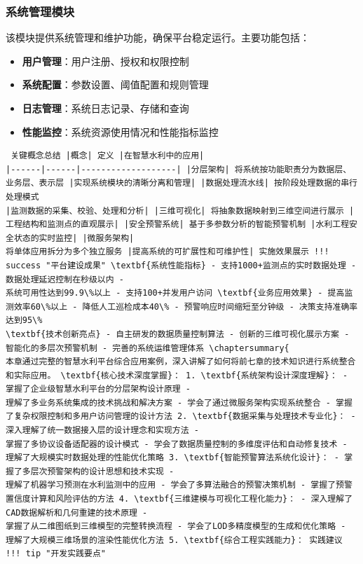 \subsubsection{系统管理模块}\label{ux7cfbux7edfux7ba1ux7406ux6a21ux5757} 该模块提供系统管理和维护功能，确保平台稳定运行。主要功能包括： \begin{itemize}
\tightlist \item \textbf{用户管理}：用户注册、授权和权限控制 \item \textbf{系统配置}：参数设置、阈值配置和规则管理 \item \textbf{日志管理}：系统日志记录、存储和查询 \item
\textbf{性能监控}：系统资源使用情况和性能指标监控 \end{itemize} \begin{verbatim} 关键概念总结 |概念| 定义 |在智慧水利中的应用|
|------|------|-------------------| |分层架构| 将系统按功能职责分为数据层、业务层、表示层 |实现系统模块的清晰分离和管理| |数据处理流水线| 按阶段处理数据的串行处理模式
|监测数据的采集、校验、处理和分析| |三维可视化| 将抽象数据映射到三维空间进行展示 |工程结构和监测点的直观展示| |安全预警系统| 基于多参数分析的智能预警机制 |水利工程安全状态的实时监控| |微服务架构|
将单体应用拆分为多个独立服务 |提高系统的可扩展性和可维护性| 实施效果展示 !!! success "平台建设成果" \textbf{系统性能指标} - 支持1000+监测点的实时数据处理 - 数据处理延迟控制在秒级以内 -
系统可用性达到99.9\%以上 - 支持100+并发用户访问 \textbf{业务应用效果} - 提高监测效率60\%以上 - 降低人工巡检成本40\% - 预警响应时间缩短至分钟级 - 决策支持准确率达到95\%
\textbf{技术创新亮点} - 自主研发的数据质量控制算法 - 创新的三维可视化展示方案 - 智能化的多层次预警机制 - 完善的系统运维管理体系 \chaptersummary{
本章通过完整的智慧水利平台综合应用案例，深入讲解了如何将前七章的技术知识进行系统整合和实际应用。 \textbf{核心技术深度掌握}： 1. \textbf{系统架构设计深度理解}： - 掌握了企业级智慧水利平台的分层架构设计原理 -
理解了多业务系统集成的技术挑战和解决方案 - 学会了通过微服务架构实现系统整合 - 掌握了复杂权限控制和多用户访问管理的设计方法 2. \textbf{数据采集与处理技术专业化}： - 深入理解了统一数据接入层的设计理念和实现方法 -
掌握了多协议设备适配器的设计模式 - 学会了数据质量控制的多维度评估和自动修复技术 - 理解了大规模实时数据处理的性能优化策略 3. \textbf{智能预警算法系统化设计}： - 掌握了多层次预警架构的设计思想和技术实现 -
理解了机器学习预测在水利监测中的应用 - 学会了多算法融合的预警决策机制 - 掌握了预警置信度计算和风险评估的方法 4. \textbf{三维建模与可视化工程化能力}： - 深入理解了CAD数据解析和几何重建的技术原理 -
掌握了从二维图纸到三维模型的完整转换流程 - 学会了LOD多精度模型的生成和优化策略 - 理解了大规模三维场景的渲染性能优化方法 5. \textbf{综合工程实践能力}： 实践建议 !!! tip "开发实践要点"

\end{verbatim}
